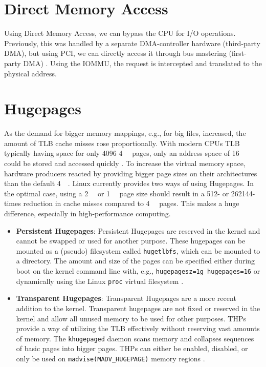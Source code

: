 \section{Direct Memory Access}
Using Direct Memory Access, we can bypass the CPU for I/O operations. Previously, this was handled by a separate DMA-controller hardware (third-party DMA), but using PCI, we can directly access it through bus mastering (first-party DMA) \cite{maellmann}. Using the IOMMU, the request is intercepted and translated to the physical address.

\section{Hugepages}
As the demand for bigger memory mappings, e.g., for big files, increased, the amount of TLB cache misses rose proportionally. With modern CPUs TLB typically having space for only 4096 \qty{4}{\kibi\byte} pages, only an address space of \qty{16}{\mebi\byte} could be stored and accessed quickly \cite{emmerich2019user}. To increase the virtual memory space, hardware producers reacted by providing bigger page sizes on their architectures than the default \qty{4}{\kibi\byte}.
Linux currently provides two ways of using Hugepages.
In the optimal case, using a \qty{2}{\mebi\byte} or \qty{1}{\gibi\byte} page size should result in a 512- or 262144-times reduction in cache misses compared to \qty{4}{\kibi\byte} pages. This makes a huge difference, especially in high-performance computing.

\begin{itemize}
    \item \textbf{Persistent Hugepages}: Persistent Hugepages are reserved in the kernel and cannot be swapped or used for another purpose. These hugepages can be mounted as a (pseudo) filesystem called \texttt{hugetlbfs}, which can be mounted to a directory. The amount and size of the pages can be specified either during boot on the kernel command line with, e.g., \texttt{hugepagesz=1g hugepages=16} or dynamically using the Linux \texttt{proc} virtual filesystem \cite{hugetlbkerneldocs}.
    \item \textbf{Transparent Hugepages}: Transparent Hugepages are a more recent addition to the kernel. Transparent hugepages are not fixed or reserved in the kernel and allow all unused memory to be used for other purposes. THPs provide a way of utilizing the TLB effectively without reserving vast amounts of memory. The \texttt{khugepaged} daemon scans memory and collapses sequences of basic pages into bigger pages. THPs can either be enabled, disabled, or only be used on \texttt{madvise(MADV\_HUGEPAGE)} memory regions \cite{transhugekerneldocs}.
\end{itemize}

